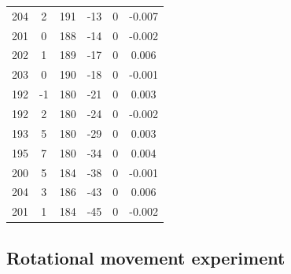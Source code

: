 \documentclass[a4paper, 12pt]{article}
\begin{document}
\begin{table}[H]
\begin{tabular}{@{}cccccc@{}}
    204                   & 2                     & 191               & -13               & 0                 & -0.007              \\
    201                   & 0                     & 188               & -14               & 0                 & -0.002              \\
    202                   & 1                     & 189               & -17               & 0                 & 0.006               \\
    203                   & 0                     & 190               & -18               & 0                 & -0.001              \\
    192                   & -1                    & 180               & -21               & 0                 & 0.003               \\
    192                   & 2                     & 180               & -24               & 0                 & -0.002              \\
    193                   & 5                     & 180               & -29               & 0                 & 0.003              \\
    195                   & 7                     & 180               & -34               & 0                 & 0.004               \\
    200                   & 5                     & 184               & -38               & 0                 & -0.001              \\
    204                   & 3                     & 186               & -43               & 0                 & 0.006               \\
    201                   & 1                     & 184               & -45               & 0                 & -0.002              \\ \bottomrule
    \end{tabular}
    \end{table}

    \subsection{Rotational movement experiment}
\end{document}
